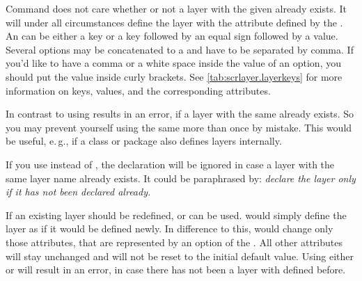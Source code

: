 Command  does not care whether or not a layer with the
given  already exists. It will under all circumstances
define the layer with the attribute defined by the .  An
 can be either a key or a key followed by an equal sign followed
by a value. Several options may be concatenated to a  and
have to be separated by comma. If you'd like to have a comma or a white space
inside the value of an option, you should put the value inside curly
brackets. See \autoref{tab:scrlayer.layerkeys} for more information on keys,
values, and the corresponding attributes.

In contrast to  using  results in
an error, if a layer with the same  already exists. So you
may prevent yourself using the same  more than once by
mistake. This would be useful, e.\,g., if a class or package also defines
layers internally.

If you use  instead of , the
declaration will be ignored in case a layer with the same layer name already
exists. It could be paraphrased by: \emph{declare the layer only if it has not
  been declared already.}

If an existing layer should be redefined,  or
 can be used.  would simply define
the layer as if it would be defined newly. In difference to this,
 would change only those attributes, that are represented
by an option of the . All other attributes will stay
unchanged and will not be reset to the initial default value. Using either
 or  will result in an error, in case
there has not been a layer with  defined before.

